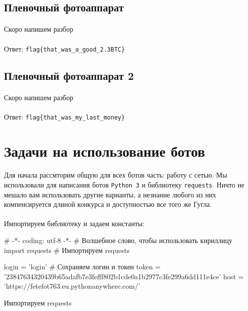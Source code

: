 \documentclass[12pt]{article}
\begin{document}
    \subsection{Пленочный фотоаппарат}
    \paragraph{}
    Скоро напишем разбор
    \paragraph{}
    Ответ: \verb|flag{that_was_a_good_2.3BTC}|

    \subsection{Пленочный фотоаппарат 2}
    \paragraph{}
    Скоро напишем разбор
    \paragraph{}
    Ответ: \verb|flag{that_was_my_last_money}|

    \newpage

    \section{Задачи на использование ботов}
	\paragraph{}
    Для начала рассмторим общую для всех ботов часть: работу с сетью.
	Мы использовали для написания ботов \verb|Python 3| и библиотеку \verb|requests|.
	Ничто не мешало вам использовать другие варианты,
	а незнание любого из них компенсируется длиной конкурса и доступностью все того же Гугла.
	\paragraph{}
    Импортируем библиотеку и задаем константы:
    \begin{listing}[H]
        \begin{pythoncode}
# -*- coding: utf-8 -*- # Волшебное слово, чтобы использовать кириллицу
import requests # Импортируем requests

login = 'login' # Сохраняем логин и токен
token = '23847634320439b65adafb7e3fefff802b1cde0a1b2977c3fe299a6dd111e4ce'
host = 'https://fetefot763.eu.pythonanywhere.com/'
        \end{pythoncode}
        \caption{Импортируем requests}
        \label{lst:import_requests}
    \end{listing}
\end{document}
